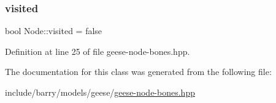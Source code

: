 \mbox{\label{class_node_aa1bdec4e775fc578632e6a2dced9e251}} 
\subsubsection{\texorpdfstring{visited}{visited}}
{\footnotesize\ttfamily bool Node\+::visited = false}



Definition at line 25 of file geese-\/node-\/bones.\+hpp.



The documentation for this class was generated from the following file\+:\begin{DoxyCompactItemize}
\item 
include/barry/models/geese/\hyperlink{geese-node-bones_8hpp}{geese-\/node-\/bones.\+hpp}\end{DoxyCompactItemize}
